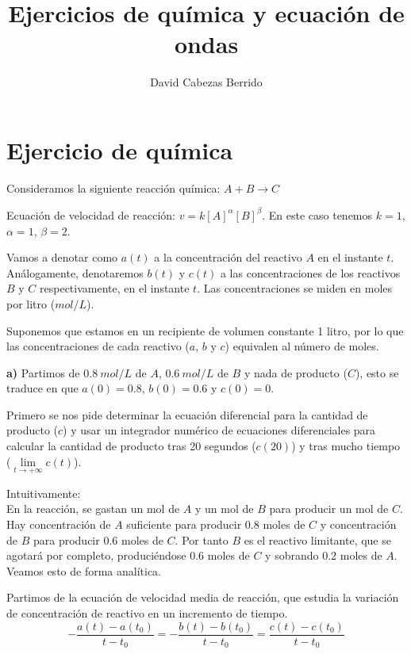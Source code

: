 \documentclass[a4]{article}
\title{Ejercicios de química y ecuación de ondas}
\author{David Cabezas Berrido}
\date{\vspace{-4mm}}
\begin{document}
\maketitle

\section{Ejercicio de química}

Consideramos la siguiente reacción química: $A+B\rightarrow C$

Ecuación de velocidad de reacción: $v=k[A]^\alpha [B]^\beta$.
En este caso tenemos $k=1$, $\alpha=1$, $\beta=2$.

Vamos a denotar como $a(t)$ a la concentración del reactivo $A$ en el
instante $t$. Análogamente, denotaremos $b(t)$ y $c(t)$ a las
concentraciones de los reactivos $B$ y $C$ respectivamente, en el
instante $t$. Las concentraciones se miden en moles por litro
($mol/L$).

Suponemos que estamos en un recipiente de volumen constante 1 litro,
por lo que las concentraciones de cada reactivo ($a$, $b$ y $c$)
equivalen al número de moles.

\textbf{a)}
Partimos de $0.8\ mol/L$ de $A$, $0.6\ mol/L$ de $B$ y nada de
producto ($C$), esto se traduce en que $a(0)=0.8$, $b(0)=0.6$ y
$c(0)=0$.

Primero se nos pide determinar la ecuación diferencial para la
cantidad de producto ($c$) y usar un integrador numérico de ecuaciones
diferenciales para calcular la cantidad de producto tras 20 segundos
($c(20)$) y tras mucho tiempo
\Big($\lim\limits_{t\to +\infty}c(t)$\Big).

\vspace{6mm}

Intuitivamente: \\
En la reacción, se gastan un mol de $A$ y un mol de $B$ para producir
un mol de $C$. Hay concentración de $A$ suficiente para producir $0.8$
moles de $C$ y concentración de $B$ para producir $0.6$ moles de
$C$. Por tanto $B$ es el reactivo limitante, que se agotará por
completo, produciéndose $0.6$ moles de $C$ y sobrando $0.2$ moles de
$A$. Veamos esto de forma analítica.

Partimos de la ecuación de velocidad media de reacción, que estudia la
variación de concentración de reactivo en un incremento de tiempo.
\begin{equation}
  \label{eq:v-media}
  -\frac{a(t)-a(t_0)}{t-t_0}=-\frac{b(t)-b(t_0)}{t-t_0}=\frac{c(t)-c(t_0)}{t-t_0}
\end{equation}
\end{document}
